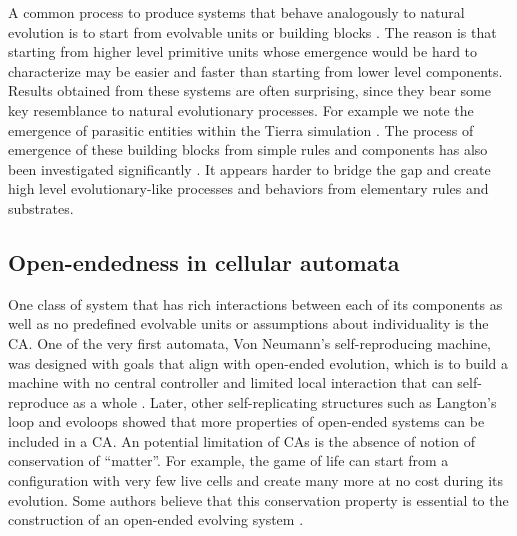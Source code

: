 A common process to produce systems that behave analogously to natural evolution
is to start from evolvable units or building blocks
\parencite{srayApproachSynthesisLife1991, simsEvolvingVirtualCreatures1994,
  ofriaAvidaSoftwarePlatform2004, yaegerComputationalGeneticsPhysiology1994,
  channonImprovingStillPassing2003, spectorDivisionBlocksOpenended2007,
  sorosIdentifyingNecessaryConditions2014}. The reason is that starting from
higher level primitive units whose emergence would be hard to characterize may
be easier and faster than starting from lower level components. Results obtained
from these systems are often surprising, since they bear some key resemblance to
natural evolutionary processes. For example we note the emergence of parasitic
entities within the Tierra simulation \parencite{srayApproachSynthesisLife1991}.
The process of emergence of these building blocks from simple rules and
components has also been investigated significantly
\parencite{bagleySpontaneousEmergenceMetabolism1991,
  huttonEvolvableSelfReproducingCells2007, flammEvolutionMetabolicNetworks2010,
  sayamaSeekingOpenendedEvolution2011}. It appears harder to bridge the gap and
create high level evolutionary-like processes and behaviors from elementary
rules and substrates.

\subsection{Open-endedness in cellular automata}
One class of system that has rich interactions between each of its components as
well as no predefined evolvable units or assumptions about individuality is the
\ac{CA}. One of the very first automata, Von Neumann's self-reproducing machine,
was designed with goals that align with open-ended evolution, which is to build
a machine with no central controller and limited local interaction that can
self-reproduce as a whole
\parencite{vonneumannTheorySelfreproducingAutomata1966,
  pesaventoImplementationNeumannSelfReproducing1995}. Later, other
self-replicating structures such as Langton's loop
\parencite{langtonSelfreproductionCellularAutomata1984} and evoloops
\parencite{sayamaNewStructurallyDissolvable1999,
  salzbergComplexGeneticEvolution2004} showed that more properties of open-ended
systems can be included in a \ac{CA}. An potential limitation of \acp{CA} is the
absence of notion of conservation of ``matter''. For example, the game of life
can start from a configuration with very few live cells and create many more at
no cost during its evolution. Some authors believe that this conservation
property is essential to the construction of an open-ended evolving system
\parencite{taylorChapterCreativityEvolution2002}.

